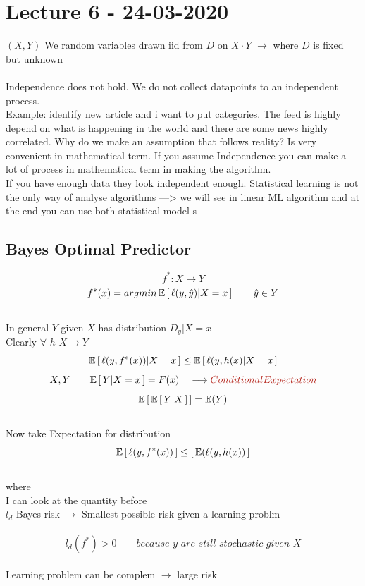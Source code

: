 \documentclass[../main.tex]{subfiles}
\begin{document}
\chapter{Lecture 6 - 24-03-2020}

$(X, Y)$ We random variables drawn iid from $D$ on $X \cdot Y$ $\longrightarrow$ where $D$ is fixed but unknown\\\\
Independence does not hold. We do not collect datapoints to an independent
process.\\
Example: identify new article and i want to put categories. The feed is highly
depend on what is happening in the world and there are some news highly
correlated. Why do we make an assumption that follows reality?
Is very convenient in mathematical term.
If you assume Independence you can make a lot of process in mathematical
term in making the algorithm.\\
If you have enough data they look independent enough. Statistical learning is
not the only way of analyse algorithms —> we will see in linear ML algorithm
and at the end you can use both statistical model s

\section{Bayes Optimal Predictor}

$$ f^* : X \rightarrow Y$$
$$ f^*(x) = argmin \, \mathbb{E}\left[ \, \ell(y,\hat{y})| X=x \, \right] \qquad \hat{y} \in Y$$
\\
In general $Y$ given $X$ has distribution $D_y|X=x$
\\
Clearly $\forall$ $h$ \quad $X\rightarrow Y$
\\
$$
\mathbb{E} \left[ \, \ell(y, f^*(x)) | X=x \, \right] \leq \mathbb{E}\left[ \, \ell(y,h(x)| X = x \, \right] 
$$
$$
X,Y \qquad \barra{E} \left[ \, Y|X = x \, \right] = F(x) \quad \longrightarrow \red{Conditional Expectation} 
$$
$$
\mathbb{E} \left[ \, \mathbb{E} \left[ \, Y|X \, \right] \, \right] = \mathbb{E}(Y)
$$
\\
Now take Expectation for distribution
$$
\mathbb{E} \left[ \, \ell(y, f^*(x))\, \right] \leq \left[ \, \mathbb{E} (\ell(y, h(x)) \, \right]
$$
\\ where 
\\
I can look at the quantity before\\
$l_d$ Bayes risk $\longrightarrow$ Smallest possible risk given a learning problm
\\\\
$$
l_d(f^*) > 0 \qquad \textit{because y are still stochastic given X}
$$
\\
Learning problem can be complem $\rightarrow$ large risk
\\\\
\end{document}
